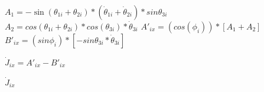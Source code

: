 \begin{algorithm}[H]
          {
            $A_1=  -\sin  \left(  \theta_{1i}+ \theta_{2i} \right) \ast \left( \dot{ \theta}_{1i}+\dot{\theta }_{2i}\right) \ast sin  \theta_{3i}$\;
            $A_2= cos(\theta_{1i}+\theta_{2i}) \ast cos(\theta_{3i}) \ast \dot{\theta}_{3i} $\;
            $A'_{ix}=(cos(\phi_i))*[A_1+A_2]$\;
            $B'_{ix}=(sin \phi _{i}) \ast \left[ -sin \theta _{3i}\ast\dot{ \theta }_{3i} \right] $\;

            $\dot{J}_{ix}=A'_{ix}-B'_{ix}$\;

        	\KwRet$\dot{J}_{ix}$\; }
        	
        	
\end{algorithm}

        \newpage
        
